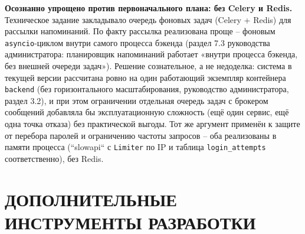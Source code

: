 \textbf{Осознанно упрощено против первоначального плана: без Celery и
Redis.} Техническое задание закладывало очередь фоновых задач
(Celery + Redis) для рассылки напоминаний. По факту рассылка реализована
проще -- фоновым \texttt{asyncio}-циклом внутри самого процесса бэкенда
(раздел 7.3 руководства администратора: планировщик напоминаний работает
«внутри процесса бэкенда, без внешней очереди задач»). Решение сознательное,
а не недоделка: система в текущей версии рассчитана ровно на один
работающий экземпляр контейнера \texttt{backend} (без горизонтального
масштабирования, руководство администратора, раздел 3.2), и при этом
ограничении отдельная очередь задач с брокером сообщений добавляла бы
эксплуатационную сложность (ещё один сервис, ещё одна точка отказа) без
практической выгоды. Тот же аргумент применён к защите от перебора
паролей и ограничению частоты запросов -- оба реализованы в памяти процесса
(``slowapi`` с \texttt{Limiter} по IP и таблица \texttt{login\_attempts}
соответственно), без Redis.

\section{ДОПОЛНИТЕЛЬНЫЕ ИНСТРУМЕНТЫ РАЗРАБОТКИ}

